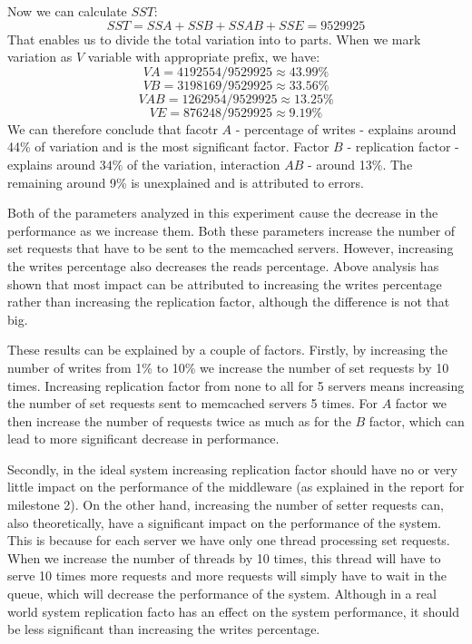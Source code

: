 \documentclass[11pt]{article}
\begin{document}
Now we can calculate $SST$:
$$SST = SSA + SSB + SSAB + SSE = 9529925$$
That enables us to divide the total variation into to parts. When we mark variation as $V$ variable with appropriate prefix, we have:
$$VA =  4192554/ 9529925 \approx 43.99\%$$
$$VB =  3198169 / 9529925 \approx 33.56\%$$
$$VAB =  1262954 / 9529925 \approx 13.25\%$$
$$VE =  876248 / 9529925 \approx 9.19\%$$
We can therefore conclude that facotr $A$ - percentage of writes - explains around 44\% of variation and is the most significant factor. Factor $B$ - replication factor - explains  around $34\%$ of the variation, interaction $AB$ - around 13\%. The remaining around 9\% is unexplained and is attributed to errors.

Both of the parameters analyzed in this experiment cause the decrease in the performance as we increase them. Both these parameters increase the number of set requests that have to be sent to the memcached servers. However, increasing the writes percentage also decreases the reads percentage. Above analysis has shown that most impact can be attributed to increasing the writes percentage rather than increasing the replication factor, although the difference is not that big.

These results can be explained by a couple of factors. Firstly, by increasing the number of writes from 1\% to 10\% we increase the number of set requests by 10 times. Increasing replication factor from none to all for 5 servers means increasing the number of set requests sent to memcached servers 5 times. For $A$ factor we then increase the number of requests twice as much as for the $B$ factor, which can lead to more significant decrease in performance.

Secondly, in the ideal system increasing replication factor should have no or very little impact on the performance of the middleware (as explained in the report for milestone 2). On the other hand, increasing the number of setter requests can, also theoretically, have a significant impact on the performance of the system. This is because for each server we have only one thread processing set requests. When we increase the number of threads by 10 times, this thread will have to serve 10 times more requests and more requests will simply have to wait in the queue, which will decrease the performance of the system. Although in a real world system replication facto has an effect on the system performance, it should be less significant than increasing the writes percentage. 
\end{document}
